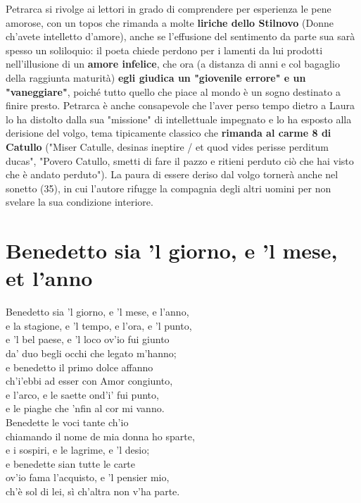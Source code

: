 \documentclass[10pt,a4paper]{article}
\begin{document}
Petrarca si rivolge ai lettori in grado di comprendere per esperienza le pene amorose, con un topos che rimanda a molte \textbf{liriche dello Stilnovo} (Donne ch'avete intelletto d'amore), anche se l'effusione del sentimento da parte sua sarà spesso un soliloquio: il poeta chiede perdono per i lamenti da lui prodotti nell'illusione di un \textbf{amore infelice}, che ora (a distanza di anni e col bagaglio della raggiunta maturità) \textbf{egli giudica un "giovenile errore" e un "vaneggiare"}, poiché tutto quello che piace al mondo è un sogno destinato a finire presto. Petrarca è anche consapevole che l'aver perso tempo dietro a Laura lo ha distolto dalla sua "missione" di intellettuale impegnato e lo ha esposto alla derisione del volgo, tema tipicamente classico che \textbf{rimanda al carme 8 di Catullo} ("Miser Catulle, desinas ineptire / et quod vides perisse perditum ducas", "Povero Catullo, smetti di fare il pazzo e ritieni perduto ciò che hai visto che è andato perduto"). La paura di essere deriso dal volgo tornerà anche nel sonetto  (35), in cui l'autore rifugge la compagnia degli altri uomini per non svelare la sua condizione interiore.

\section{Benedetto sia 'l giorno, e 'l mese, et l'anno}

\begin{estratto}
	Benedetto sia 'l giorno, e 'l mese, e l'anno,\\
	e la stagione, e 'l tempo, e l'ora, e 'l punto,\\
	e 'l bel paese, e 'l loco ov'io fui giunto\\
	da' duo begli occhi che legato m'hanno;\\
	
	e benedetto il primo dolce affanno\\
	ch'i'ebbi ad esser con Amor congiunto,\\
	e l'arco, e le saette ond'i' fui punto,\\
	e le piaghe che 'nfin al cor mi vanno.\\
	
	Benedette le voci tante ch'io\\
	chiamando il nome de mia donna ho sparte,\\
	e i sospiri, e le lagrime, e 'l desio;\\
	
	e benedette sian tutte le carte\\
	ov'io fama l'acquisto, e 'l pensier mio,\\
	ch'è sol di lei, sì ch'altra non v'ha parte.\\
\end{estratto}
\end{document}
